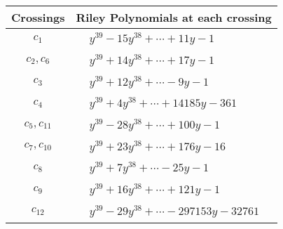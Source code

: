 \documentclass[1p]{elsarticle_modified}
\theoremstyle{definition}
\begin{document}
\begin{tabular}{m{50pt}|m{274pt}}
Crossings & \hspace{64pt}Riley Polynomials at each crossing \\
\hline $$\begin{aligned}c_{1}\end{aligned}$$&$\begin{aligned}
&y^{39}-15 y^{38}+\cdots+11 y-1
\end{aligned}$\\
\hline $$\begin{aligned}c_{2},c_{6}\end{aligned}$$&$\begin{aligned}
&y^{39}+14 y^{38}+\cdots+17 y-1
\end{aligned}$\\
\hline $$\begin{aligned}c_{3}\end{aligned}$$&$\begin{aligned}
&y^{39}+12 y^{38}+\cdots-9 y-1
\end{aligned}$\\
\hline $$\begin{aligned}c_{4}\end{aligned}$$&$\begin{aligned}
&y^{39}+4 y^{38}+\cdots+14185 y-361
\end{aligned}$\\
\hline $$\begin{aligned}c_{5},c_{11}\end{aligned}$$&$\begin{aligned}
&y^{39}-28 y^{38}+\cdots+100 y-1
\end{aligned}$\\
\hline $$\begin{aligned}c_{7},c_{10}\end{aligned}$$&$\begin{aligned}
&y^{39}+23 y^{38}+\cdots+176 y-16
\end{aligned}$\\
\hline $$\begin{aligned}c_{8}\end{aligned}$$&$\begin{aligned}
&y^{39}+7 y^{38}+\cdots-25 y-1
\end{aligned}$\\
\hline $$\begin{aligned}c_{9}\end{aligned}$$&$\begin{aligned}
&y^{39}+16 y^{38}+\cdots+121 y-1
\end{aligned}$\\
\hline $$\begin{aligned}c_{12}\end{aligned}$$&$\begin{aligned}
&y^{39}-29 y^{38}+\cdots-297153 y-32761
\end{aligned}$\\
\hline
\end{tabular}\\~\\
\end{document}
